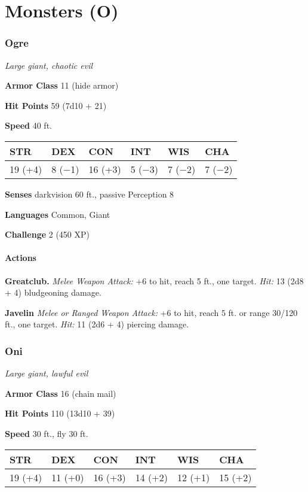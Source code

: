\documentclass[
]{article}
\date{}
\begin{document}
\hypertarget{monsters-o}{%
\section{Monsters (O)}\label{monsters-o}}

\hypertarget{ogre}{%
\subsubsection{Ogre}\label{ogre}}

\emph{Large giant, chaotic evil}

\textbf{Armor Class} 11 (hide armor)

\textbf{Hit Points} 59 (7d10 + 21)

\textbf{Speed} 40 ft.

\begin{longtable}[]{@{}llllll@{}}
\toprule
STR & DEX & CON & INT & WIS & CHA\tabularnewline
\midrule
\endhead
19 (+4) & 8 (−1) & 16 (+3) & 5 (−3) & 7 (−2) & 7 (−2)\tabularnewline
\bottomrule
\end{longtable}

\textbf{Senses} darkvision 60 ft., passive Perception 8

\textbf{Languages} Common, Giant

\textbf{Challenge} 2 (450 XP)

\hypertarget{actions}{%
\paragraph{Actions}\label{actions}}

\textbf{Greatclub.} \emph{Melee Weapon Attack:} +6 to hit, reach 5 ft.,
one target. \emph{Hit:} 13 (2d8 + 4) bludgeoning damage.

\textbf{Javelin} \emph{Melee or Ranged Weapon Attack:} +6 to hit, reach
5 ft. or range 30/120 ft., one target. \emph{Hit:} 11 (2d6 + 4) piercing
damage.

\hypertarget{oni}{%
\subsubsection{Oni}\label{oni}}

\emph{Large giant, lawful evil}

\textbf{Armor Class} 16 (chain mail)

\textbf{Hit Points} 110 (13d10 + 39)

\textbf{Speed} 30 ft., fly 30 ft.

\begin{longtable}[]{@{}llllll@{}}
\toprule
STR & DEX & CON & INT & WIS & CHA\tabularnewline
\midrule
\endhead
19 (+4) & 11 (+0) & 16 (+3) & 14 (+2) & 12 (+1) & 15 (+2)\tabularnewline
\bottomrule
\end{longtable}
\end{document}

